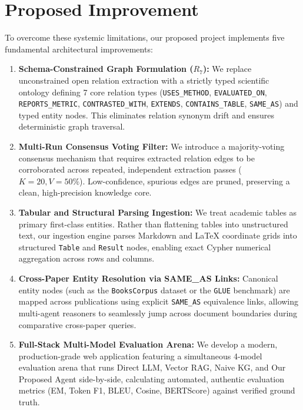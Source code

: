 \section{Proposed Improvement}
To overcome these systemic limitations, our proposed project implements five fundamental architectural improvements:
\begin{enumerate}
    \item \textbf{Schema-Constrained Graph Formulation ($R_7$):} We replace unconstrained open relation extraction with a strictly typed scientific ontology defining 7 core relation types (\texttt{USES\_METHOD}, \texttt{EVALUATED\_ON}, \texttt{REPORTS\_METRIC}, \texttt{CONTRASTED\_WITH}, \texttt{EXTENDS}, \texttt{CONTAINS\_TABLE}, \texttt{SAME\_AS}) and typed entity nodes. This eliminates relation synonym drift and ensures deterministic graph traversal.
    \item \textbf{Multi-Run Consensus Voting Filter:} We introduce a majority-voting consensus mechanism that requires extracted relation edges to be corroborated across repeated, independent extraction passes ($K=20, V=50\%$). Low-confidence, spurious edges are pruned, preserving a clean, high-precision knowledge core.
    \item \textbf{Tabular and Structural Parsing Ingestion:} We treat academic tables as primary first-class entities. Rather than flattening tables into unstructured text, our ingestion engine parses Markdown and LaTeX coordinate grids into structured \texttt{Table} and \texttt{Result} nodes, enabling exact Cypher numerical aggregation across rows and columns.
    \item \textbf{Cross-Paper Entity Resolution via SAME\_AS Links:} Canonical entity nodes (such as the \texttt{BooksCorpus} dataset or the \texttt{GLUE} benchmark) are mapped across publications using explicit \texttt{SAME\_AS} equivalence links, allowing multi-agent reasoners to seamlessly jump across document boundaries during comparative cross-paper queries.
    \item \textbf{Full-Stack Multi-Model Evaluation Arena:} We develop a modern, production-grade web application featuring a simultaneous 4-model evaluation arena that runs Direct LLM, Vector RAG, Naive KG, and Our Proposed Agent side-by-side, calculating automated, authentic evaluation metrics (EM, Token F1, BLEU, Cosine, BERTScore) against verified ground truth.
\end{enumerate}

